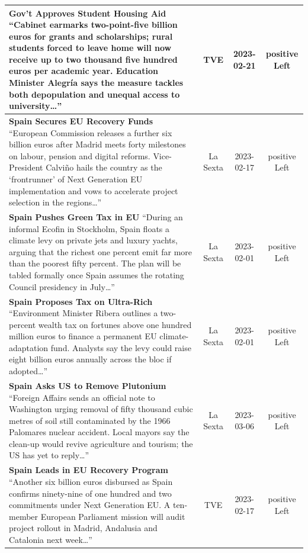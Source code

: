 \documentclass[12pt]{article}
\begin{document}
\begin{center}
\begin{longtable}{|p{8cm}|c|c|c|}
	\textbf{Gov’t Approves Student Housing Aid}\newline
	{\scriptsize“Cabinet earmarks two-point-five billion euros for grants and scholarships; rural students forced to leave home will now receive up to two thousand five hundred euros per academic year.  Education Minister Alegría says the measure tackles both depopulation and unequal access to university…”}
	& TVE & 2023-02-21 & positive Left\\
	\hline
	
	\textbf{Spain Secures EU Recovery Funds}\newline
	{\scriptsize“European Commission releases a further six billion euros after Madrid meets forty milestones on labour, pension and digital reforms.  Vice-President Calviño hails the country as the ‘frontrunner’ of Next Generation EU implementation and vows to accelerate project selection in the regions…”}
	& La Sexta & 2023-02-17 & positive Left\\
	\hline
	
	\textbf{Spain Pushes Green Tax in EU}\newline
	{\scriptsize“During an informal Ecofin in Stockholm, Spain floats a climate levy on private jets and luxury yachts, arguing that the richest one percent emit far more than the poorest fifty percent.  The plan will be tabled formally once Spain assumes the rotating Council presidency in July…”}
	& La Sexta & 2023-02-01 & positive Left\\
	\hline
	
	\textbf{Spain Proposes Tax on Ultra-Rich}\newline
	{\scriptsize“Environment Minister Ribera outlines a two-percent wealth tax on fortunes above one hundred million euros to finance a permanent EU climate-adaptation fund.  Analysts say the levy could raise eight billion euros annually across the bloc if adopted…”}
	& La Sexta & 2023-02-01 & positive Left\\
	\hline
	
	\textbf{Spain Asks US to Remove Plutonium}\newline
	{\scriptsize“Foreign Affairs sends an official note to Washington urging removal of fifty thousand cubic metres of soil still contaminated by the 1966 Palomares nuclear accident.  Local mayors say the clean-up would revive agriculture and tourism; the US has yet to reply…”}
	& La Sexta & 2023-03-06 & positive Left\\
	\hline
	
	\textbf{Spain Leads in EU Recovery Program}\newline
	{\scriptsize“Another six billion euros disbursed as Spain confirms ninety-nine of one hundred and two commitments under Next Generation EU.  A ten-member European Parliament mission will audit project rollout in Madrid, Andalusia and Catalonia next week…”}
	& TVE & 2023-02-17 & positive Left\\
	\hline
	

\end{longtable}
\end{center}
\end{document}
